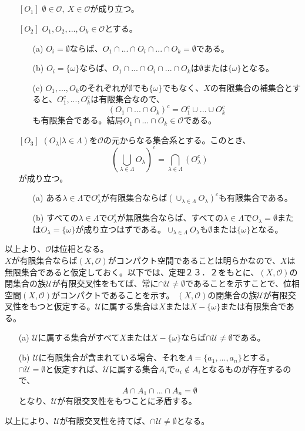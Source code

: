 \documentclass{jsarticle}
\begin{document}
\subsection{}
\begin{enumerate}
\item[{$[O_1]$}]
$\emptyset\in\mathcal{O},\ X\in\mathcal{O}$が成り立つ。
\item[{$[O_2]$}]
$O_1,O_2,...,O_k\in\mathcal{O}$とする。
\begin{enumerate}
\item[(a)]
$O_i=\emptyset$ならば、$O_1\cap...\cap O_i\cap...\cap O_k=\emptyset$である。
\item[(b)]
$O_i=\{\omega\}$ならば、$O_1\cap...\cap O_i\cap...\cap O_k$は$\emptyset$または$\{\omega\}$となる。
\item[(c)]
$O_1,...,O_k$のそれぞれが$\emptyset$でも$\{\omega\}$でもなく、$X$の有限集合の補集合とすると、$O_1^c,...,O_k^c$は有限集合なので、
\[(O_1\cap...\cap O_k)^c=O_1^c\cup...\cup O_k^c\]
も有限集合である。結局$O_1\cap...\cap O_k\in\mathcal{O}$である。
\end{enumerate}
\item[{$[O_3]$}]
$(O_\lambda|\lambda\in\Lambda)$を$\mathcal{O}$の元からなる集合系とする。このとき、\[(\bigcup_{\lambda\in\Lambda}O_\lambda)^c=\bigcap_{\lambda\in\Lambda}(O_\lambda^c)\]が成り立つ。
\begin{enumerate}
\item[(a)]
ある$\lambda\in\Lambda$で$O_\lambda^c$が有限集合ならば$(\cup_{\lambda\in\Lambda}O_\lambda)^c$も有限集合である。
\item[(b)]
すべての$\lambda\in\Lambda$で$O_\lambda^c$が無限集合ならば、すべての$\lambda\in\Lambda$で$O_\lambda=\emptyset$または$O_\lambda=\{\omega\}$が成り立つはずである。$\cup_{\lambda\in\Lambda}O_\lambda$も$\emptyset$または$\{\omega\}$となる。
\end{enumerate}
\end{enumerate}
以上より、$\mathcal{O}$は位相となる。\\
$X$が有限集合ならば$(X,\mathcal{O})$がコンパクト空間であることは明らかなので、$X$は無限集合であると仮定しておく。以下では、定理２３．２をもとに、$(X,\mathcal{O})$の閉集合の族$\mathcal{U}$が有限交叉性をもてば、常に$\cap\mathcal{U}\neq\emptyset$であることを示すことで、位相空間$(X,\mathcal{O})$がコンパクトであることを示す。
$(X,\mathcal{O})$の閉集合の族$\mathcal{U}$が有限交叉性をもつと仮定する。$\mathcal{U}$に属する集合は$X$または$X-\{\omega\}$または有限集合である。
\begin{enumerate}
\item[(a)]
$\mathcal{U}$に属する集合がすべて$X$または$X-\{\omega\}$ならば$\cap\mathcal{U}\neq\emptyset$である。
\item[(b)]
$\mathcal{U}$に有限集合が含まれている場合、それを$A=\{a_1,...,a_n\}$とする。$\cap\mathcal{U}=\emptyset$と仮定すれば、$\mathcal{U}$に属する集合$A_i$で$a_i\notin A_i$となるものが存在するので、
\[A\cap A_1\cap...\cap A_n=\emptyset\]
となり、$\mathcal{U}$が有限交叉性をもつことに矛盾する。
\end{enumerate}
以上により、$\mathcal{U}$が有限交叉性を持てば、$\cap\mathcal{U}\neq\emptyset$となる。
\end{document}
